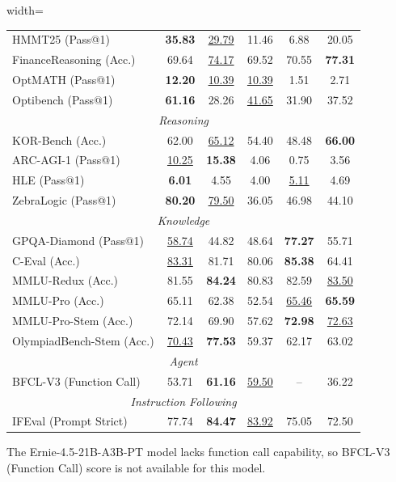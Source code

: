 \documentclass[table]{gtech}
\theoremstyle{definition}
\begin{document}
\begin{table}[t]
\begin{adjustbox}{width=\linewidth}
\begin{threeparttable}
\begin{tabular}{lccccc}
     HMMT25 (Pass@1) & \textbf{35.83} & \underline{29.79} & 11.46 & 6.88 & 20.05 \\
     FinanceReasoning (Acc.) & 69.64 & \underline{74.17} & 69.52 & 70.55 & \textbf{77.31} \\
     OptMATH (Pass@1) & \textbf{12.20} & \underline{10.39} & \underline{10.39} & 1.51 & 2.71 \\
     Optibench (Pass@1) & \textbf{61.16} & 28.26 & \underline{41.65} & 31.90 & 37.52 \\
     \midrule \multicolumn{6}{c}{\textit{Reasoning}} \\
    \midrule KOR-Bench (Acc.) & 62.00 & \underline{65.12} & 54.40 & 48.48 & \textbf{66.00} \\
     ARC-AGI-1 (Pass@1) & \underline{10.25} & \textbf{15.38} & 4.06 & 0.75 & 3.56 \\
     HLE (Pass@1) & \textbf{6.01} & 4.55 & 4.00 & \underline{5.11} & 4.69 \\
     ZebraLogic (Pass@1) & \textbf{80.20} & \underline{79.50} & 36.05 & 46.98 & 44.10 \\
    \midrule \multicolumn{6}{c}{\textit{Knowledge}} \\
    \midrule GPQA-Diamond (Pass@1) & \underline{58.74} & 44.82 & 48.64 & \textbf{77.27} & 55.71 \\
     C-Eval (Acc.) & \underline{83.31} & 81.71 & 80.06 & \textbf{85.38} & 64.41 \\
     MMLU-Redux (Acc.) & 81.55 & \textbf{84.24} & 80.83 & 82.59 & \underline{83.50} \\
     MMLU-Pro (Acc.) & 65.11 & 62.38 & 52.54 & \underline{65.46} & \textbf{65.59} \\
     MMLU-Pro-Stem (Acc.) & 72.14 & 69.90 & 57.62 & \textbf{72.98} & \underline{72.63} \\
     OlympiadBench-Stem (Acc.) & \underline{70.43} & \textbf{77.53} & 59.37 & 62.17 & 63.02 \\
    \midrule \multicolumn{6}{c}{\textit{Agent}} \\
    \midrule BFCL-V3 (Function Call)\tnote{1} & 53.71 & \textbf{61.16} & \underline{59.50} & -- & 36.22 \\
    \midrule \multicolumn{6}{c}{\textit{Instruction Following}} \\
    \midrule IFEval (Prompt Strict) & 77.74 & \textbf{84.47} & \underline{83.92} & 75.05 & 72.50 \\
    \hline
    \end{tabular}
    \begin{tablenotes}
        \footnotesize
        \item[1] The Ernie-4.5-21B-A3B-PT model lacks function call capability, so BFCL-V3 (Function Call) score is not available for this model.
    \end{tablenotes}
    \end{threeparttable}
    \end{adjustbox}
\end{table}
\end{document}
